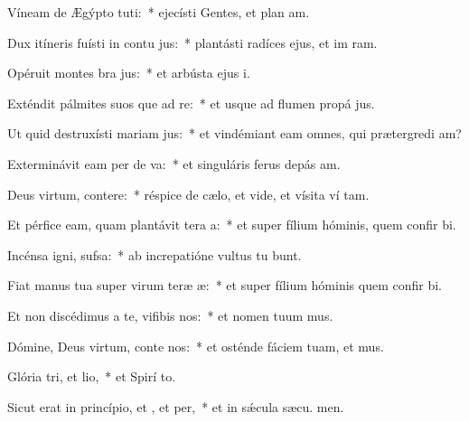 \item Víneam de Ægýpto tuti:~* ejecísti Gentes, et plan am.
\item Dux itíneris fuísti in contu jus:~* plantásti radíces ejus, et im ram.
\item Opéruit montes bra jus:~* et arbústa ejus  i.
\item Exténdit pálmites suos que ad re:~* et usque ad flumen propá jus.
\item Ut quid destruxísti mariam jus:~* et vindémiant eam omnes, qui prætergredi am?
\item Exterminávit eam per de va:~* et singuláris ferus depás  am.
\item Deus virtum, contere:~* réspice de cælo, et vide, et vísita ví tam.
\item Et pérfice eam, quam plantávit tera a:~* et super fílium hóminis, quem confir bi.
\item Incénsa igni,  sufsa:~* ab increpatióne vultus tu bunt.
\item Fiat manus tua super virum teræ æ:~* et super fílium hóminis quem confir bi.
\item Et non discédimus a te, vifibis nos:~* et nomen tuum mus.
\item Dómine, Deus virtum, conte nos:~* et osténde fáciem tuam, et  mus.
\item Glória tri, et lio,~* et Spirí to.
\item Sicut erat in princípio, et , et per,~* et in sǽcula sæcu. men.
